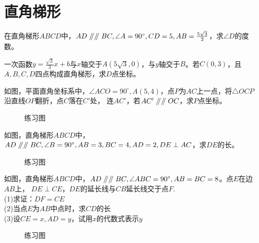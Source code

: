 \section{直角梯形}
\begin{problem}
在直角梯形$ABCD$中，$AD\mathrel{/\mkern-5mu/}\mathrel{/\mkern-5mu/} BC,\angle A=90^\circ,CD=5,AB=\frac{5\sqrt3}{2}$，求$\angle D$的度数。\\
\end{problem}
\begin{problem}
一次函数$y=\frac{\sqrt3}{3}x+b$与$x$轴交于$A(5\sqrt3,0)$，与$y$轴交于$B$。若$C(0,3)$，且$A,B,C,D$四点构成直角梯形，求$D$点坐标。\\
\end{problem}
\begin{problem}
如图，平面直角坐标系中，$\angle ACO=90^\circ,A(5,4)$，点$P$为$AC$上一点，将$\triangle OCP$沿直线$OP$翻折，点$C$落在$C'$处，
连$AC'$，若$AC'\mathrel{/\mkern-5mu/} \mathrel{/\mkern-5mu/} OC$，求$P$点坐标。
\end{problem}
\begin{problem}
\begin{figure}[H]
    \centering
    \resizebox{4cm}{!}{}
    \caption{练习图}
\end{figure}
如图，直角梯形$ABCD$中，$AD\mathrel{/\mkern-5mu/}\mathrel{/\mkern-5mu/} BC,\angle B=90^\circ,AB=3,BC=4,AD=2,DE\perp AC$，求$DE$的长。
\end{problem}
\begin{figure}[H]
    \centering
    \resizebox{3cm}{!}{}
    \caption{练习图}
\end{figure}
\begin{problem}
如图，直角梯形$ABCD$中，$AD\mathrel{/\mkern-5mu/}\mathrel{/\mkern-5mu/} BC,\angle ABC=90^\circ,AB=BC=8$。点$E$在边$AB$上，
$DE\perp CE$，$DE$的延长线与$CB$延长线交于点$F$. \\
(1)求证：$DF=CE$ \\
(2)当点$E$为$AB$中点时，求$CD$的长 \\
(3)设$CE=x,AD=y$，试用$x$的代数式表示$y$ \\
\end{problem}
\begin{figure}[H]
    \centering
    \resizebox{4cm}{!}{}
    \caption{练习图}
\end{figure}
\clearpage

